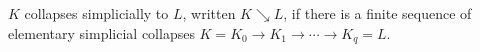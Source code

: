$K$ collapses simplicially to $L$, written $K \searrow L$, if there is a finite sequence of elementary simplicial collapses $K = K_0 \rightarrow K_1 \rightarrow \cdots \rightarrow K_q = L$.
